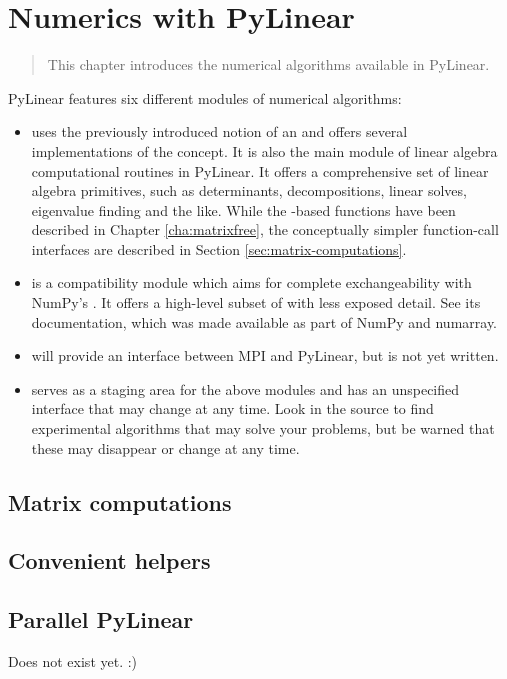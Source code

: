 \chapter{Numerics with PyLinear}
\label{cha:numerics}

\begin{quote}
   This chapter introduces the numerical algorithms available
   in PyLinear.
\end{quote}

PyLinear features six different modules of numerical algorithms:
\begin{itemize}
  \item {} uses the previously introduced 
    notion of an  and offers several implementations 
    of the concept. It is also the main module of linear
    algebra computational routines in PyLinear. It offers a
    comprehensive set of linear algebra primitives, such as
    determinants, decompositions, linear solves, eigenvalue finding
    and the like. While the -based functions have
    been described in Chapter \ref{cha:matrixfree}, the conceptually
    simpler function-call interfaces are described in Section
    \ref{sec:matrix-computations}.
  \item {} is a compatibility module 
    which aims for complete exchangeability with NumPy's .
    It offers a high-level subset of  
    with less exposed detail. See its documentation, which was made
    available as part of NumPy and numarray.
  \item {} will provide an interface between
   MPI and PyLinear, but is not yet written.
  \item {} serves as a staging area for
    the above modules and has an unspecified interface that may 
    change at any time. Look in the source to find experimental
    algorithms that may solve your problems, but be warned that
    these may disappear or change at any time.
\end{itemize}

\section{Matrix computations}
\section{Convenient helpers}
\section{Parallel PyLinear}

Does not exist yet. :)
